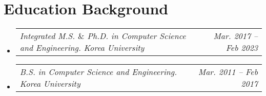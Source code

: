\documentclass[letterpaper,11pt]{article}
\makeatletter
\newcommand{\resumeSubheadingTwo}[2]{
  \vspace{-2pt}\item
    \begin{tabular*}{1.0\textwidth}[t]{l@{\extracolsep{\fill}}r}
      \textit{#1} & \textit{#2} \\
    \end{tabular*}\vspace{-7pt}
}
\newcommand{\resumeSubHeadingListStart}{\begin{itemize}[leftmargin=0.0in, label={}]}
\newcommand{\resumeSubHeadingListEnd}{\end{itemize}}
\makeatother
\begin{document}













\section{Education Background}
  \resumeSubHeadingListStart
  \resumeSubheadingTwo
      {Integrated M.S. $\&$ Ph.D. in Computer Science and Engineering. Korea University}{Mar. 2017 -- Feb 2023}\vspace{-12pt}
      \resumeSubheadingTwo
      {B.S. in Computer Science and Engineering. Korea University}{Mar. 2011 -- Feb 2017}      
  \resumeSubHeadingListEnd

\end{document}
